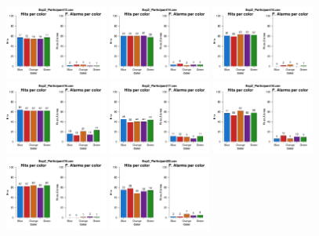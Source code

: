 \begin{figure}[th]
\includegraphics[width=0.30\textwidth]{Figures/Color_Exp2_P13} \includegraphics[width=0.30\textwidth]{Figures/Color_Exp2_P14} \includegraphics[width=0.30\textwidth]{Figures/Color_Exp2_P15}
\includegraphics[width=0.30\textwidth]{Figures/Color_Exp2_P16} \includegraphics[width=0.30\textwidth]{Figures/Color_Exp2_P17} \includegraphics[width=0.30\textwidth]{Figures/Color_Exp2_P18}
\includegraphics[width=0.30\textwidth]{Figures/Color_Exp2_P19} \includegraphics[width=0.30\textwidth]{Figures/Color_Exp2_P20} 
\caption[Color_Exp2]{}
\label{fig:Color_E2}
\end{figure}



